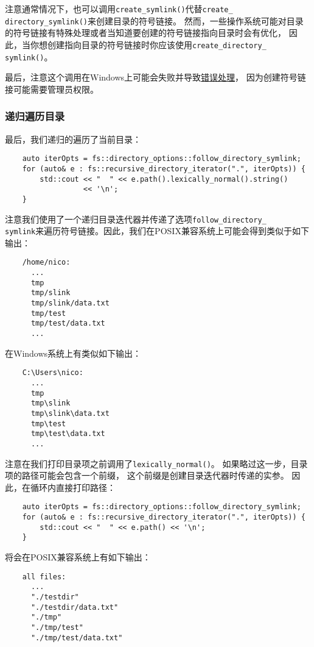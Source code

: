 注意通常情况下，也可以调用\texttt{create\_symlink()}代替\texttt{create\_\\
directory\_symlink()}来创建目录的符号链接。
然而，一些操作系统可能对目录的符号链接有特殊处理或者当知道要创建的符号链接指向目录时会有优化，
因此，当你想创建指向目录的符号链接时你应该使用\texttt{create\_directory\_\\
symlink()}。

最后，注意这个调用在Windows上可能会失败并导致\hyperref[创建链接失败]{错误处理}，
因为创建符号链接可能需要管理员权限。

\subsubsection*{递归遍历目录}
最后，我们递归的遍历了当前目录：
\begin{lstlisting}
    auto iterOpts = fs::directory_options::follow_directory_symlink;
    for (auto& e : fs::recursive_directory_iterator(".", iterOpts)) {
        std::cout << "  " << e.path().lexically_normal().string()
                  << '\n';
    }
\end{lstlisting}
注意我们使用了一个递归目录迭代器并传递了选项\texttt{follow\_directory\_\\
symlink}来遍历符号链接。因此，我们在POSIX兼容系统上可能会得到类似于如下输出：
\begin{lstlisting}
    /home/nico:
      ...
      tmp
      tmp/slink
      tmp/slink/data.txt
      tmp/test
      tmp/test/data.txt
      ...
\end{lstlisting}
在Windows系统上有类似如下输出：
\begin{lstlisting}
    C:\Users\nico:
      ...
      tmp
      tmp\slink
      tmp\slink\data.txt
      tmp\test
      tmp\test\data.txt
      ...
\end{lstlisting}
注意在我们打印目录项之前调用了\texttt{lexically\_normal()}。
如果略过这一步，目录项的路径可能会包含一个前缀，
这个前缀是创建目录迭代器时传递的实参。
因此，在循环内直接打印路径：
\begin{lstlisting}
    auto iterOpts = fs::directory_options::follow_directory_symlink;
    for (auto& e : fs::recursive_directory_iterator(".", iterOpts)) {
        std::cout << "  " << e.path() << '\n';
    }
\end{lstlisting}
将会在POSIX兼容系统上有如下输出：
\begin{lstlisting}
    all files:
      ...
      "./testdir"
      "./testdir/data.txt"
      "./tmp"
      "./tmp/test"
      "./tmp/test/data.txt"
\end{lstlisting}
